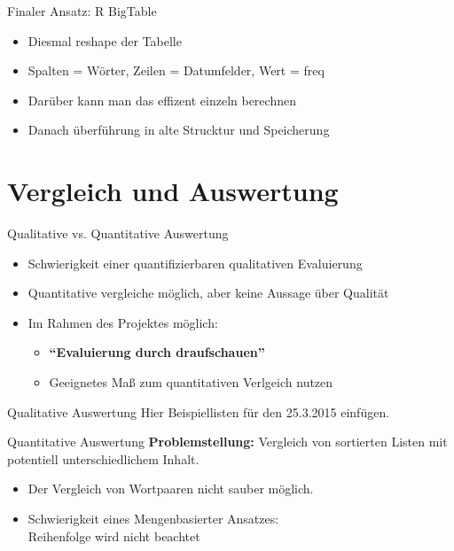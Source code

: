 \documentclass{beamer}
\begin{document}
\begin{frame}{Finaler Ansatz: R BigTable}
	\begin{itemize}
		\item Diesmal reshape der Tabelle
		\item Spalten = Wörter, Zeilen = Datumfelder, Wert = freq
		\item Darüber kann man das effizent einzeln berechnen
		\item Danach überführung in alte Strucktur und Speicherung
	\end{itemize}

\end{frame}

\section{Vergleich und Auswertung}
\begin{frame} \sectionpage \end{frame}
\begin{frame}{Qualitative vs. Quantitative Auswertung}
	\begin{itemize}
		\item{Schwierigkeit einer quantifizierbaren qualitativen Evaluierung}
		\item{Quantitative vergleiche m\"oglich, aber keine Aussage \"uber Qualit\"at}
		\item{Im Rahmen des Projektes m\"oglich:
			\begin{itemize}
				\item{\textbf{``Evaluierung durch draufschauen''}}
				\item{Geeignetes Maß zum quantitativen Verlgeich nutzen}
			\end{itemize}
		}
	\end{itemize}
\end{frame}

\begin{frame}{Qualitative Auswertung}
Hier Beispiellisten f\"ur den 25.3.2015 einf\"ugen.
\end{frame}

\begin{frame}{Quantitative Auswertung}
	\textbf{Problemstellung: }Vergleich von sortierten Listen mit potentiell unterschiedlichem Inhalt.
	\begin{itemize}
		\item{Der Vergleich von Wortpaaren nicht sauber m\"oglich.}
		\item{Schwierigkeit eines Mengenbasierter Ansatzes:\\Reihenfolge wird nicht beachtet }
	\end{itemize}	
\end{frame}
\end{document}
